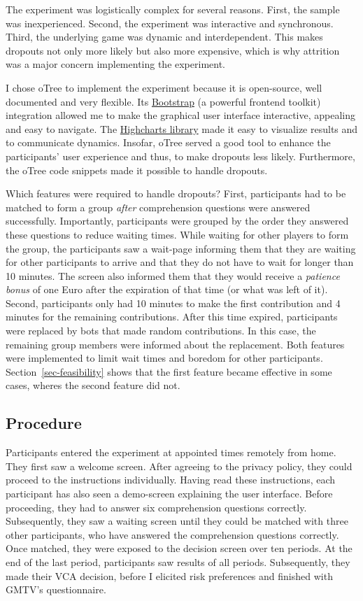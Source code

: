 \documentclass[
  authoryear,
  preprint,
  3p]{elsarticle}
\begin{document}
The experiment was logistically complex for several reasons. First, the
sample was inexperienced. Second, the experiment was interactive and
synchronous. Third, the underlying game was dynamic and interdependent.
This makes dropouts not only more likely but also more expensive, which
is why attrition was a major concern implementing the experiment.

I chose oTree \citep{oTree} to implement the experiment because it is
open-source, well documented and very flexible. Its
\href{https://getbootstrap.com/}{Bootstrap} (a powerful frontend
toolkit) integration allowed me to make the graphical user interface
interactive, appealing and easy to navigate. The
\href{https://www.highcharts.com/}{Highcharts library} made it easy to
visualize results and to communicate dynamics. Insofar, oTree served a
good tool to enhance the participants' user experience and thus, to make
dropouts less likely. Furthermore, the oTree code snippets made it
possible to handle dropouts.

Which features were required to handle dropouts? First, participants had
to be matched to form a group \emph{after} comprehension questions were
answered successfully. Importantly, participants were grouped by the
order they answered these questions to reduce waiting times. While
waiting for other players to form the group, the participants saw a
wait-page informing them that they are waiting for other participants to
arrive and that they do not have to wait for longer than 10 minutes. The
screen also informed them that they would receive a \emph{patience
bonus} of one Euro after the expiration of that time (or what was left
of it). Second, participants only had 10 minutes to make the first
contribution and 4 minutes for the remaining contributions. After this
time expired, participants were replaced by bots that made random
contributions. In this case, the remaining group members were informed
about the replacement. Both features were implemented to limit wait
times and boredom for other participants. Section~\ref{sec-feasibility}
shows that the first feature became effective in some cases, wheres the
second feature did not.

\hypertarget{sec-procedure}{%
\subsection{Procedure}\label{sec-procedure}}

Participants entered the experiment at appointed times remotely from
home. They first saw a welcome screen. After agreeing to the privacy
policy, they could proceed to the instructions individually. Having read
these instructions, each participant has also seen a demo-screen
explaining the user interface. Before proceeding, they had to answer six
comprehension questions correctly. Subsequently, they saw a waiting
screen until they could be matched with three other participants, who
have answered the comprehension questions correctly. Once matched, they
were exposed to the decision screen over ten periods. At the end of the
last period, participants saw results of all periods. Subsequently, they
made their VCA decision, before I elicited risk preferences
\citep{HoltLaury2002} and finished with GMTV's questionnaire.
\end{document}
